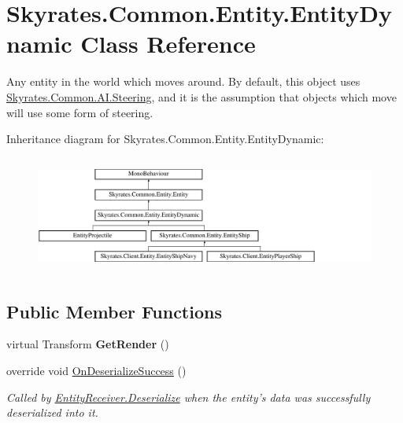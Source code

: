 \hypertarget{class_skyrates_1_1_common_1_1_entity_1_1_entity_dynamic}{\section{Skyrates.\-Common.\-Entity.\-Entity\-Dynamic Class Reference}
\label{class_skyrates_1_1_common_1_1_entity_1_1_entity_dynamic}
}


Any entity in the world which moves around. By default, this object uses \hyperlink{class_skyrates_1_1_common_1_1_a_i_1_1_steering}{Skyrates.\-Common.\-A\-I.\-Steering}, and it is the assumption that objects which move will use some form of steering.  


Inheritance diagram for Skyrates.\-Common.\-Entity.\-Entity\-Dynamic\-:\begin{figure}[H]
\begin{center}
\leavevmode
\includegraphics[height=3.888889cm]{class_skyrates_1_1_common_1_1_entity_1_1_entity_dynamic}
\end{center}
\end{figure}
\subsection*{Public Member Functions}
\begin{DoxyCompactItemize}
\item 
\hypertarget{class_skyrates_1_1_common_1_1_entity_1_1_entity_dynamic_ad59c47f109bef0238b5303646a59e430}{virtual Transform {\bfseries Get\-Render} ()}\label{class_skyrates_1_1_common_1_1_entity_1_1_entity_dynamic_ad59c47f109bef0238b5303646a59e430}

\item 
override void \hyperlink{class_skyrates_1_1_common_1_1_entity_1_1_entity_dynamic_aedeb63ce173df35eb21d75161d01028d}{On\-Deserialize\-Success} ()
\begin{DoxyCompactList}\small\item\em Called by \hyperlink{class_skyrates_1_1_common_1_1_entity_1_1_entity_receiver_a9da0b7c3a8b9e1ed7d10be74ce80482b}{Entity\-Receiver.\-Deserialize} when the entity's data was successfully deserialized into it. \end{DoxyCompactList}\end{DoxyCompactItemize}
